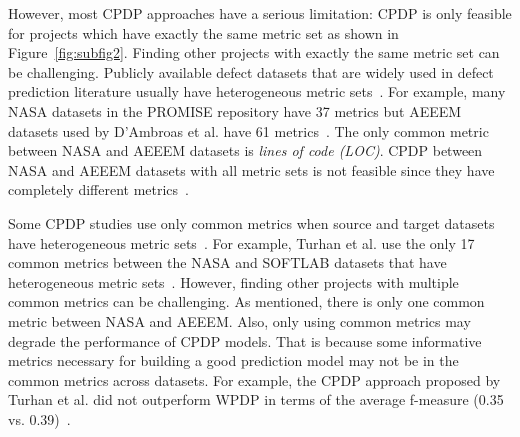 However, most CPDP approaches have a serious limitation:
CPDP is only feasible for projects which have exactly the same metric
set as shown in Figure~\ref{fig:subfig2}. Finding other projects with exactly
the same metric set can be challenging. Publicly available defect
datasets that are widely used in defect prediction literature usually have
heterogeneous metric sets~\cite{DAmbros12,promise12,Nam13}.
For example, many NASA datasets in the PROMISE repository have 37 metrics but
AEEEM datasets used by D'Ambroas et al. have 61
metrics~\cite{DAmbros12,promise12}.
The only common metric between NASA and AEEEM datasets is {\em lines of
code (LOC)}.
CPDP between NASA and AEEEM
datasets with all metric sets is not feasible since they have
completely different metrics~\cite{Turhan09}.


Some CPDP studies use only common metrics when source and target datasets have
heterogeneous metric sets~\cite{Ma12,Turhan09}.
For example, Turhan et al. use the only 17 common metrics between the NASA and
SOFTLAB datasets that have heterogeneous metric sets~\cite{Turhan09}. However,
finding other projects with multiple common metrics can be challenging. As
mentioned, there is only one common metric between NASA and AEEEM. Also,
only using common metrics may degrade the performance of CPDP models.
That is because some informative metrics necessary for building a good prediction model may not
be in the common metrics across datasets. For example, the CPDP approach proposed by Turhan et al. did not
outperform WPDP in terms of the average
f-measure (0.35 vs. 0.39)~\cite{Turhan09}.

